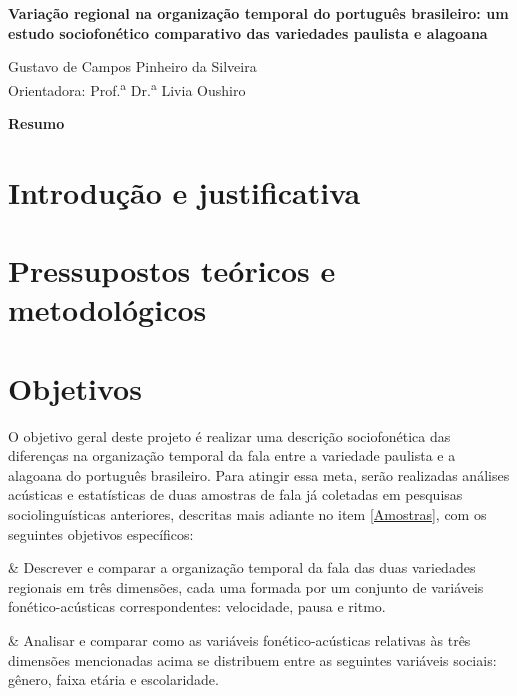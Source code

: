 \documentclass[
			a4paper,		%
			12pt,			%
			]{article}		%
\begin{document}
	
{ %
	\begin{center}
		{\bfseries\Large\sffamily
			Variação regional na organização temporal do português brasileiro: um estudo 
			sociofonético comparativo das variedades paulista e alagoana
		}
	\end{center}
}
	
	\vspace{0.35em}
{ %
	\begin{flushright} 
		Gustavo de Campos Pinheiro da Silveira \\ 
		\vspace{5pt}
		Orientadora: Prof.\textsuperscript{a} Dr.\textsuperscript{a} Livia Oushiro
	\end{flushright}

	\begin{center} 
	    {\bfseries\sffamily Resumo} \\ 
	\end{center}
	\blindtext \par
	\vspace{0.35em}
		
}

\section{Introdução e justificativa}

\section{Pressupostos teóricos e metodológicos}

\section{Objetivos}

O objetivo geral deste projeto é realizar uma descrição sociofonética das diferenças na organização temporal da fala entre a variedade paulista e a alagoana do português brasileiro. Para atingir essa meta, serão realizadas análises acústicas e estatísticas de duas amostras de fala já coletadas em pesquisas sociolinguísticas anteriores, descritas mais adiante no item \ref{Amostras}, com os seguintes objetivos específicos:

\begin{easylist}[enumerate]
	& Descrever e comparar a organização temporal da fala das duas variedades regionais em três dimensões, cada uma formada por um conjunto de variáveis fonético-acústicas correspondentes: velocidade, pausa e ritmo.
	
	& Analisar e comparar como as variáveis fonético-acústicas relativas às três dimensões mencionadas acima se distribuem entre as seguintes variáveis sociais: gênero, faixa etária e escolaridade.
\end{easylist}
\end{document}
